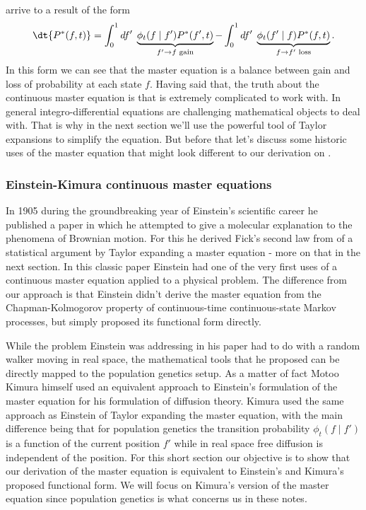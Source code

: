 arrive to a result of the form
\begin{equation}
  \dt{P^*(f, t)} = \int_0^1 df' \;
  \underbrace{
  \phi_t(f \mid f') P^*(f', t)
  }_{f' \rightarrow f \text{ gain}} -
  \int_0^1 df' \;
  \underbrace{
  \phi_t(f' \mid f) P^*(f, t)
  }_{f \rightarrow f' \text{ loss}}.
  \label{eq_master_eq_full}
\end{equation}
In this form we can see that the master equation is a balance between gain and
loss of probability at each state $f$. Having said that, the truth about the
continuous master equation is that is extremely complicated to work with. In
general integro-differential equations are challenging mathematical objects to
deal with. That is why in the next section we'll use the powerful tool of
Taylor expansions to simplify the equation. But before that let's discuss some
historic uses of the master equation that might look different to our
derivation
on .

\subsubsection{Einstein-Kimura continuous master equations}

In 1905 during the groundbreaking year of Einstein's scientific career he
published a paper in which he attempted to give a molecular explanation to the
phenomena of Brownian motion. For this he derived Fick's second law from of a
statistical argument by Taylor expanding a master equation - more on that in
the next section. In this classic paper Einstein had one of the very first uses
of a continuous master equation applied to a physical problem. The difference
from our approach is that Einstein didn't derive the master equation from the
Chapman-Kolmogorov property of continuous-time continuous-state Markov
processes, but simply proposed its functional form directly.

While the problem Einstein was addressing in his paper had to do with a random
walker moving in real space, the mathematical tools that he proposed can be
directly mapped to the population genetics setup. As a matter of fact Motoo
Kimura himself used an equivalent approach to Einstein's formulation of the
master equation for his formulation of diffusion theory. Kimura used the same
approach as Einstein of Taylor expanding the master equation, with the main
difference being that for population genetics the transition probability
$\phi_t(f \mid f')$ is a function of the current position $f'$ while in real
space free diffusion is independent of the position. For this short section our
objective is to show that our derivation of the master equation is equivalent
to Einstein's and Kimura's proposed functional form. We will focus on Kimura's
version of the master equation since population genetics is what concerns us in
these notes.

